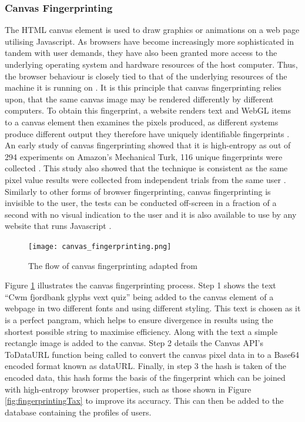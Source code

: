 \documentclass[12pt]{article}
\begin{document}
\subsubsection{Canvas Fingerprinting}
The HTML canvas element is used to draw graphics or animations on a web page utilising Javascript. As browsers have become increasingly more sophisticated in tandem with user demands, they have also been granted more access to the underlying operating system and hardware resources of the host computer. Thus, the browser behaviour is closely tied to that of the underlying resources of the machine it is running on \parencite{canvasFP}. It is this principle that canvas fingerprinting relies upon, that the same canvas image may be rendered differently by different computers. To obtain this fingerprint, a website renders text and WebGL items to a canvas element then examines the pixels produced, as different systems produce different output they therefore have uniquely identifiable fingerprints \parencite{canvasFP}. An early study of canvas fingerprinting showed that it is high-entropy as out of 294 experiments on Amazon's Mechanical Turk, 116 unique fingerprints were collected \parencite{canvasFP}. This study also showed that the technique is consistent as the same pixel value results were collected from independent trials from the same user \parencite{canvasFP}. Similarly to other forms of browser fingerprinting, canvas fingerprinting is invisible to the user, the tests can be conducted off-screen in a fraction of a second with no visual indication to the user and it is also available to use by any website that runs Javascript \parencite{canvasFP}. \\

\begin{figure}[H]
    \centering
    \texttt{[image: canvas\_fingerprinting.png]}
    \caption{The flow of canvas fingerprinting adapted from \parencite{webNeverForgets}}
    \label{fig:canvas_fingerprinting}
\end{figure}

Figure \ref{fig:canvas_fingerprinting} illustrates the canvas fingerprinting process. Step 1 shows the text ``Cwm fjordbank glyphs vext quiz” being added to the canvas element of a webpage in two different fonts and using different styling. This text is chosen as it is a perfect pangram, which helps to ensure divergence in results using the shortest possible string to maximise efficiency. Along with the text a simple rectangle image is added to the canvas. Step 2 details the Canvas API’s ToDataURL function being called to convert the canvas pixel data in to a Base64 encoded format known as dataURL. Finally, in step 3 the hash is taken of the encoded data, this hash forms the basis of the fingerprint which can be joined with high-entropy browser properties, such as those shown in Figure \ref{fig:fingerprintingTax} to improve its accuracy. This can then be added to the database containing the profiles of users. \\     
\end{document}
